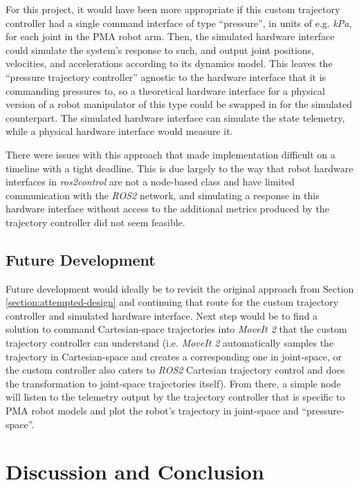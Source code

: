 \documentclass[conference]{IEEEtran}
\begin{document}
	For this project, it would have been more appropriate if this custom trajectory controller had a single command interface of type ``pressure'', in units of e.g. \textit{kPa}, for each joint in the \ac{PMA} robot arm. Then, the simulated hardware interface could simulate the system's response to such, and output joint positions, velocities, and accelerations according to its dynamics model. This leaves the ``pressure trajectory controller'' agnostic to the hardware interface that it is commanding pressures to, so a theoretical hardware interface for a physical version of a robot manipulator of this type could be swapped in for the simulated counterpart. The simulated hardware interface can simulate the state telemetry, while a physical hardware interface would measure it.

	There were issues with this approach that made implementation difficult on a timeline with a tight deadline. This is due largely to the way that robot hardware interfaces in \textit{ros2\textunderscore control} are not a node-based class and have limited communication with the \textit{ROS2} network, and simulating a response in this hardware interface without access to the additional metrics produced by the trajectory controller did not seem feasible.

	\subsection{Future Development}

	Future development would ideally be to revisit the original approach from Section \ref{section:attempted-design} and continuing that route for the custom trajectory controller and simulated hardware interface. Next step would be to find a solution to command Cartesian-space trajectories into \textit{MoveIt 2} that the custom trajectory controller can understand (i.e. \textit{MoveIt 2} automatically samples the trajectory in Cartesian-space and creates a corresponding one in joint-space, or the custom controller also caters to \textit{ROS2} Cartesian trajectory control and does the transformation to joint-space trajectories itself). From there, a simple node will listen to the telemetry output by the trajectory controller that is specific to \ac{PMA} robot models and plot the robot's trajectory in joint-space and ``pressure-space''.

	\section{Discussion and Conclusion}
\end{document}

